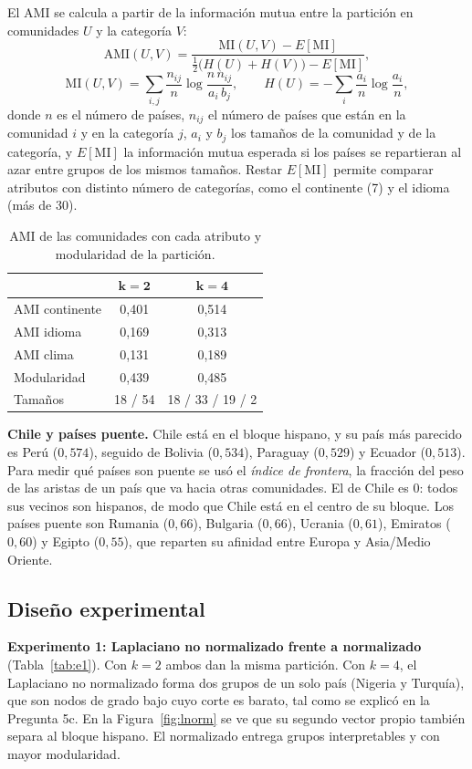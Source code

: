 \documentclass[11pt,a4paper]{article}
\begin{document}
El AMI se calcula a partir de la información mutua entre la partición en comunidades $U$ y la categoría $V$:
\[
\mathrm{AMI}(U,V)=\frac{\mathrm{MI}(U,V)-E[\mathrm{MI}]}{\tfrac{1}{2}\big(H(U)+H(V)\big)-E[\mathrm{MI}]},
\]
\[
\mathrm{MI}(U,V)=\sum_{i,j}\frac{n_{ij}}{n}\log\frac{n\,n_{ij}}{a_i\,b_j},\qquad
H(U)=-\sum_i\frac{a_i}{n}\log\frac{a_i}{n},
\]
donde $n$ es el número de países, $n_{ij}$ el número de países que están en la comunidad $i$ y en la categoría $j$, $a_i$ y $b_j$ los tamaños de la comunidad y de la categoría, y $E[\mathrm{MI}]$ la información mutua esperada si los países se repartieran al azar entre grupos de los mismos tamaños. Restar $E[\mathrm{MI}]$ permite comparar atributos con distinto número de categorías, como el continente (7) y el idioma (más de 30).

\begin{table}[H]
\centering\small
\caption{AMI de las comunidades con cada atributo y modularidad de la partición.}\label{tab:eval}
\begin{tabular}{lcc}
\toprule
 & $\mathbf{k=2}$ & $\mathbf{k=4}$\\
\midrule
AMI continente & 0,401 & 0,514\\
AMI idioma & 0,169 & 0,313\\
AMI clima & 0,131 & 0,189\\
Modularidad & 0,439 & 0,485\\
Tamaños & 18 / 54 & 18 / 33 / 19 / 2\\
\bottomrule
\end{tabular}
\end{table}

\textbf{Chile y países puente.} Chile está en el bloque hispano, y su país más parecido es Perú ($0{,}574$), seguido de Bolivia ($0{,}534$), Paraguay ($0{,}529$) y Ecuador ($0{,}513$). Para medir qué países son puente se usó el \emph{índice de frontera}, la fracción del peso de las aristas de un país que va hacia otras comunidades. El de Chile es $0$: todos sus vecinos son hispanos, de modo que Chile está en el centro de su bloque. Los países puente son Rumania ($0{,}66$), Bulgaria ($0{,}66$), Ucrania ($0{,}61$), Emiratos ($0{,}60$) y Egipto ($0{,}55$), que reparten su afinidad entre Europa y Asia/Medio Oriente.

\subsection{Diseño experimental}

\textbf{Experimento 1: Laplaciano no normalizado frente a normalizado} (Tabla~\ref{tab:e1}). Con $k=2$ ambos dan la misma partición. Con $k=4$, el Laplaciano no normalizado forma dos grupos de un solo país (Nigeria y Turquía), que son nodos de grado bajo cuyo corte es barato, tal como se explicó en la Pregunta 5c. En la Figura~\ref{fig:lnorm} se ve que su segundo vector propio también separa al bloque hispano. El normalizado entrega grupos interpretables y con mayor modularidad.
\end{document}
